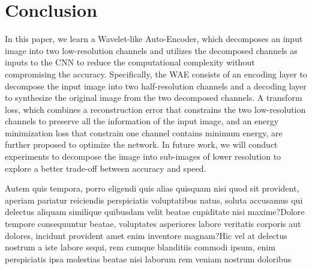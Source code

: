 \documentclass[letterpaper]{article} %
\begin{document}
\section{Conclusion}
In this paper, we learn a Wavelet-like Auto-Encoder, which decomposes an input image into two low-resolution channels and utilizes the decomposed channels as inputs to the CNN to reduce the computational complexity without compromising the accuracy. Specifically, the WAE consists of an encoding layer to decompose the input image into two half-resolution channels and a decoding layer to synthesize the original image from the two decomposed channels. A transform loss, which combines a reconstruction error that constrains the two low-resolution channels to preserve all the information of the input image, and an energy minimization loss that constrain one channel contains minimum energy, are further proposed to optimize the network.
In future work, we will conduct experiments to decompose the image into sub-images of lower resolution to explore a better trade-off between accuracy and speed.


Autem quis tempora, porro eligendi quis alias quisquam nisi quod sit provident, aperiam pariatur reiciendis perspiciatis voluptatibus natus, soluta accusamus qui delectus aliquam similique quibusdam velit beatae cupiditate nisi maxime?Dolore tempore consequuntur beatae, voluptates asperiores labore veritatis corporis aut dolores, incidunt provident amet enim inventore magnam?Hic vel at delectus nostrum a iste labore sequi, rem cumque blanditiis commodi ipsum, enim perspiciatis ipsa molestias beatae nisi laborum rem veniam nostrum doloribus

\end{document}
